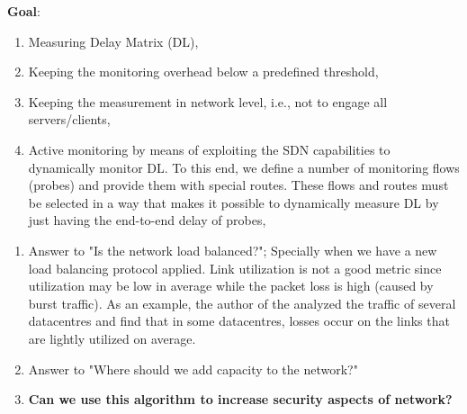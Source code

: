 \documentclass[10pt, journal, letterpaper]{IEEEtran}
\begin{document}
\textbf{Goal}: 
\begin{enumerate}
    \item Measuring Delay Matrix (DL),
    \item Keeping the monitoring overhead below a predefined threshold,
    \item Keeping the measurement in network level, i.e., not to engage all servers/clients,
    \item Active monitoring by means of exploiting the SDN capabilities to dynamically monitor DL. To this end, we define a number of monitoring flows (probes) and provide them with special routes. These flows and routes must be selected in a way that makes it possible to dynamically measure DL by just having the end-to-end delay of probes,
\end{enumerate}  
\begin{enumerate}
    \item Answer to "Is the network load balanced?"; Specially when we have a new load balancing protocol applied. Link utilization is not a good metric since utilization may be low in average while the packet loss is high (caused by burst traffic). As an example, the author of the \cite{benson2012new} analyzed the traffic of several datacentres and find that in some datacentres, losses occur on the links that are lightly utilized on average\cite{benson2012new}.
    \item Answer to "Where should we add capacity to the network?"
    \item \textbf{Can we use this algorithm to increase security aspects of network?}
\end{enumerate}
\end{document}
